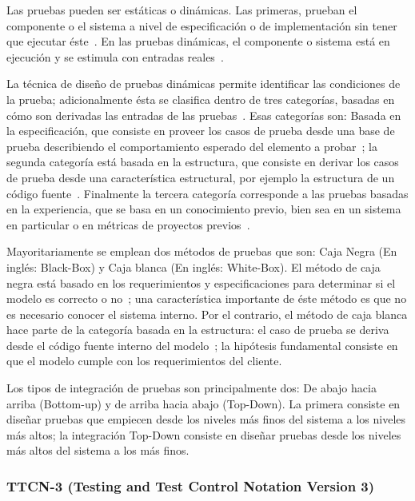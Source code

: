 Las pruebas pueden ser est\'aticas o din\'amicas. Las primeras, prueban el 
componente o el sistema a nivel de especificaci\'on o de implementaci\'on sin 
tener que ejecutar \'este~\cite{Ammann2008,Homes2013,ISOIEC29119}. En 
las pruebas din\'amicas, el componente o sistema est\'a en ejecuci\'on y se 
estimula con entradas reales~\cite{Ammann2008,Homes2013}. 

La t\'ecnica de dise\~no de pruebas din\'amicas permite identificar las 
condiciones de la prueba; adicionalmente \'esta se clasifica dentro de tres 
categor\'ias, basadas en c\'omo son derivadas las entradas de las 
pruebas~\cite{ISOIEC29119}. Esas categor\'ias son: Basada en la 
especificaci\'on, 
que consiste en proveer los casos de prueba desde una base de prueba 
describiendo el comportamiento esperado del elemento a 
probar~\cite{ISOIEC29119}; la segunda categor\'ia est\'a basada en la 
estructura, que 
consiste en derivar los casos de prueba desde una caracter\'istica estructural, 
por ejemplo la estructura de un c\'odigo fuente~\cite{ISOIEC29119}. Finalmente 
la tercera categor\'ia corresponde a las pruebas basadas en la experiencia, que 
se basa en un conocimiento previo, bien sea en un sistema en particular o en 
m\'etricas de proyectos previos~\cite{Homes2013}.

Mayoritariamente se emplean dos m\'etodos de pruebas que son: Caja Negra (En 
ingl\'es: Black-Box) y Caja blanca (En ingl\'es: White-Box). El m\'etodo de caja 
negra est\'a basado en los requerimientos y especificaciones para determinar si 
el modelo es correcto o no~\cite{Homes2013,Ammann2008}; una caracter\'istica 
importante de \'este m\'etodo es que no es necesario conocer el sistema interno. 
Por el contrario, el m\'etodo de caja blanca hace parte de la categor\'ia basada 
en la estructura: el caso de prueba se deriva desde el c\'odigo fuente interno 
del modelo~\cite{Ammann2008}; la hip\'otesis fundamental consiste en que el 
modelo cumple con los requerimientos del cliente.  

Los tipos de integraci\'on de pruebas son principalmente dos: De abajo hacia 
arriba (Bottom-up) y de arriba hacia abajo (Top-Down). La primera consiste en 
dise\~nar pruebas que empiecen desde los niveles m\'as finos del sistema a los 
niveles m\'as altos; la integraci\'on Top-Down consiste en dise\~nar pruebas 
desde los niveles m\'as altos del sistema a los m\'as finos.

\subsubsection{TTCN-3 (Testing and Test Control Notation Version 3)}


